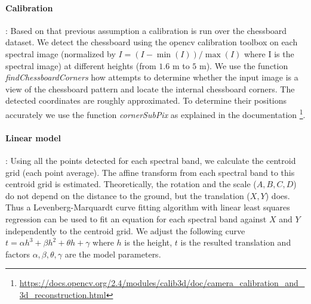 \documentclass[a4paper,twoside]{article}
\begin{document}
	\paragraph{Calibration} :
	Based on that previous assumption a calibration is run over the chessboard dataset.
	We detect the chessboard using the opencv calibration toolbox \cite{Bouguet2001CameraCT}
	on each spectral image (normalized by $I = (I-\min(I))/\max(I)$ where I is the spectral image) at different heights (from $1.6$ m to $5$ m).
	We use the function \textit{findChessboardCorners} how attempts to determine whether the input image is a view of the chessboard pattern and locate the internal chessboard corners.
	The detected coordinates are roughly approximated. To determine their positions accurately we use the function \textit{cornerSubPix} as explained in the documentation \footnote{\url{https://docs.opencv.org/2.4/modules/calib3d/doc/camera_calibration_and_3d_reconstruction.html}}.
	
	\paragraph{Linear model} :
	Using all the points detected for each spectral band, we calculate the centroid grid (each point average).
	The affine transform from each spectral band to this centroid grid is estimated.
	Theoretically, the rotation and the scale ($A,B,C,D$) do not depend on the distance to the ground, but the translation ($X,Y$) does.
	Thus a Levenberg-Marquardt curve fitting algorithm with linear least squares regression \cite{More78}
	can be used to fit an equation for each spectral band against $X$ and $Y$ independently to the centroid grid.
	We adjust the following curve $t = \alpha h^3 + \beta h^2 + \theta h + \gamma$ where $h$ is the height,
	$t$ is the resulted translation and factors $\alpha,\beta,\theta,\gamma$ are the model parameters.
	
\end{document}
